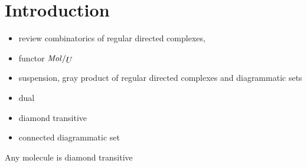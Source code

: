 \section*{Introduction}

\begin{itemize}
    \item review combinatorics of regular directed complexes, 
    \item functor \( \molecin{U} \)
    \item suspension, gray product of regular directed complexes and diagrammatic sets
    \item dual
    \item diamond transitive
    \item connected diagrammatic set
\end{itemize}

\begin{lem} \label{lem:diamond_transitive}
    Any molecule is diamond transitive
\end{lem}
